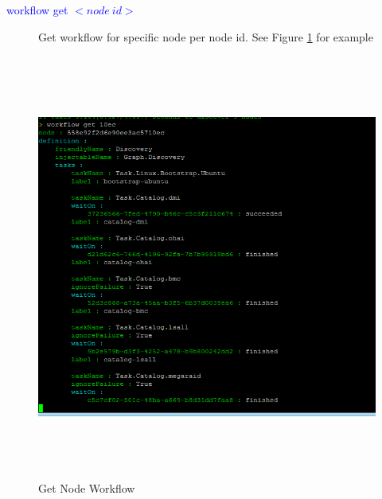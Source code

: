 \documentclass [12pt, a4paper, titlepage]{article}
\begin{document}
        \begin{description}
            \item[\textcolor{blue}{workflow get $<node\ id>$}] Get workflow for specific node per node id. See Figure \ref{workflows2} for example
        \end{description}
        \begin{figure}[H]
        \begin{center}
        \includegraphics[width=13cm,height=14cm]{png/workflows2.png}
        \end{center}
        \caption{Get Node Workflow}
        \label{workflows2}
        \end{figure}
\end{document}

